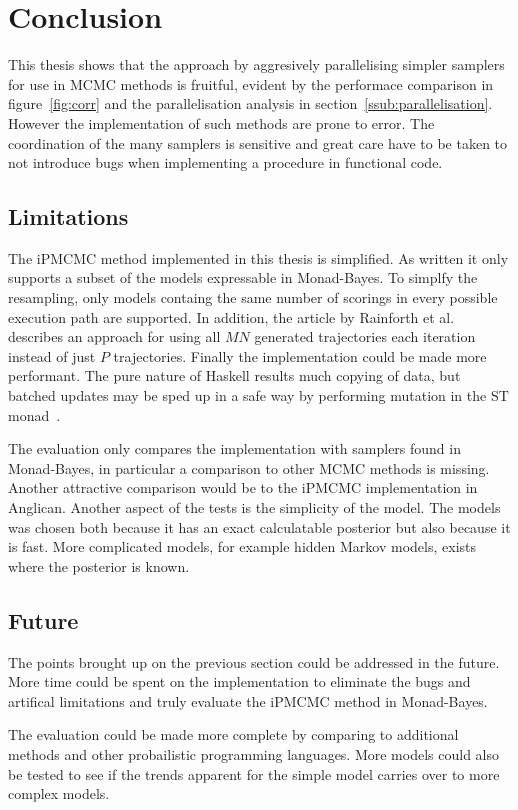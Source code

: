 \section{Conclusion}

This thesis shows that the approach by aggresively parallelising simpler samplers for use in MCMC methods is fruitful, evident by the performace comparison in figure~\ref{fig:corr} and the parallelisation analysis in section~\ref{ssub:parallelisation}. However the implementation of such methods are prone to error. The coordination of the many samplers is sensitive and great care have to be taken to not introduce bugs when implementing a procedure in functional code.

\subsection{Limitations}
\label{sec:limits}

The iPMCMC method implemented in this thesis is simplified. As written it only supports a subset of the models expressable in Monad-Bayes. To simplfy the resampling, only models containg the same number of scorings in every possible execution path are supported. In addition, the article by Rainforth et al. describes an approach for using all $MN$ generated trajectories each iteration instead of just $P$ trajectories. Finally the implementation could be made more performant. The pure nature of Haskell results much copying of data, but batched updates may be sped up in a safe way by performing mutation in the ST monad~\cite{stmonad}.

The evaluation only compares the implementation with samplers found in Monad-Bayes, in particular a comparison to other MCMC methods is missing. Another attractive comparison would be to the iPMCMC implementation in Anglican. Another aspect of the tests is the simplicity of the model. The models was chosen both because it has an exact calculatable posterior but also because it is fast. More complicated models, for example hidden Markov models, exists where the posterior is known.

\subsection{Future}

The points brought up on the previous section could be addressed in the future. More time could be spent on the implementation to eliminate the bugs and artifical limitations and truly evaluate the iPMCMC method in Monad-Bayes. 

The evaluation could be made more complete by comparing to additional methods and other probailistic programming languages. More models could also be tested to see if the trends apparent for the simple model carries over to more complex models.
